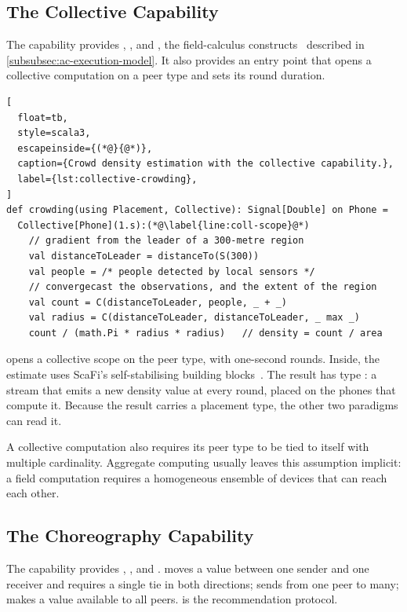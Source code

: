 \subsection{The Collective Capability}
\label{subsec:aggregate-capability}

The  capability provides , , and ,
the field-calculus constructs~\cite{VIROLI2019100486} described in \cref{subsubsec:ac-execution-model}.
It also provides an entry point that opens a collective computation on a peer type and sets its round duration.

\begin{lstlisting}[
  float=tb,
  style=scala3,
  escapeinside={(*@}{@*)},
  caption={Crowd density estimation with the collective capability.},
  label={lst:collective-crowding},
]
def crowding(using Placement, Collective): Signal[Double] on Phone =
  Collective[Phone](1.s):(*@\label{line:coll-scope}@*)
    // gradient from the leader of a 300-metre region
    val distanceToLeader = distanceTo(S(300))
    val people = /* people detected by local sensors */
    // convergecast the observations, and the extent of the region
    val count = C(distanceToLeader, people, _ + _)
    val radius = C(distanceToLeader, distanceToLeader, _ max _)
    count / (math.Pi * radius * radius)   // density = count / area
\end{lstlisting}

 opens a collective scope on the  peer type, with one-second rounds.
%
Inside, the estimate uses ScaFi's self-stabilising building blocks~\cite{casadei2022scafi}.
%
The result has type \;\;:
a stream that emits a new density value at every round, placed on the phones that compute it.
%
Because the result carries a placement type, the other two paradigms can read it.

A collective computation also requires its peer type to be tied to itself with multiple cardinality.
%
Aggregate computing usually leaves this assumption implicit:
a field computation requires a homogeneous ensemble of devices that can reach each other.

\subsection{The Choreography Capability}
\label{subsec:choreography-capability}

The  capability provides , , and .
%
 moves a value between one sender and one receiver and requires a single tie in both directions;
 sends from one peer to many;
 makes a value available to all peers.
%
 is the recommendation protocol.

